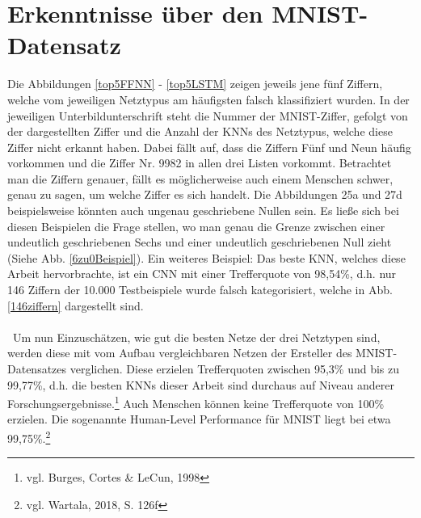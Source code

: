 \documentclass[a4paper,12pt,ngerman,oneside]{scrreprt}	%
\begin{document}
		\section{Erkenntnisse über den MNIST-Datensatz}
		Die Abbildungen \ref{top5FFNN} - \ref{top5LSTM} zeigen jeweils jene fünf Ziffern, welche vom jeweiligen Netztypus am häufigsten falsch klassifiziert wurden. In der jeweiligen Unterbildunterschrift steht die Nummer der MNIST-Ziffer, gefolgt von der dargestellten Ziffer und die Anzahl der KNNs des Netztypus, welche diese Ziffer nicht erkannt haben. Dabei fällt auf, dass die Ziffern Fünf und Neun häufig vorkommen und die Ziffer Nr. 9982 in allen drei Listen vorkommt. Betrachtet man die Ziffern genauer, fällt es möglicherweise auch einem Menschen schwer, genau zu sagen, um welche Ziffer es sich handelt. Die Abbildungen 25a und 27d beispielsweise könnten auch ungenau geschriebene Nullen sein. Es ließe sich bei diesen Beispielen die Frage stellen, wo man genau die Grenze zwischen einer undeutlich geschriebenen Sechs und einer undeutlich geschriebenen Null zieht (Siehe Abb. \ref{6zu0Beispiel}). Ein weiteres Beispiel: Das beste KNN, welches diese Arbeit hervorbrachte, ist ein CNN mit einer Trefferquote von 98,54\%, d.h. nur 146 Ziffern der 10.000 Testbeispiele wurde falsch kategorisiert, welche in Abb. \ref{146ziffern} dargestellt sind. 
		\\ \
		\\ \
		Um nun Einzuschätzen, wie gut die besten Netze der drei Netztypen sind, werden diese mit vom Aufbau vergleichbaren Netzen der Ersteller des MNIST-Datensatzes verglichen. Diese erzielen Trefferquoten zwischen 95,3\% und bis zu 99,77\%, d.h. die besten KNNs dieser Arbeit sind durchaus auf Niveau anderer Forschungsergebnisse.\footnote{vgl. Burges, Cortes \& LeCun, 1998} Auch Menschen können keine Trefferquote von 100\% erzielen. Die sogenannte Human-Level Performance für MNIST liegt bei etwa 99,75\%.\footnote{vgl. Wartala, 2018, S. 126f} 
\end{document}
